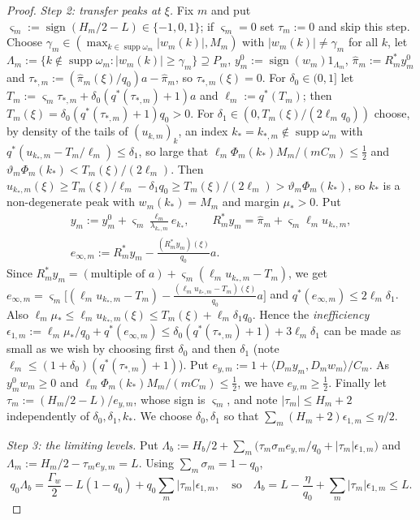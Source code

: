 \documentclass[10pt]{amsart}
\theoremstyle{definition}
\theoremstyle{remark}
\newcommand{\supp}{\operatorname{supp}}
\newcommand{\sgn}{\operatorname{sign}}
\newcommand{\ip}[2]{\langle #1,#2\rangle}
\begin{document}
\begin{proof}
\emph{Step 2: transfer peaks at $\xi$.}  Fix $m$ and put
$\varsigma_m:=\sgn(H_m/2-L)\in\{-1,0,1\}$; if $\varsigma_m=0$ set
$\tau_m:=0$ and skip this step.  Choose $\gamma_m\in(\max_{k\in\supp\omega_m}
|w_m(k)|,M_m)$ with $|w_m(k)|\ne\gamma_m$ for all $k$, let
$\Lambda_m:=\{k\notin\supp\omega_m:|w_m(k)|\ge\gamma_m\}\supseteq P_m$,
$y^0_m:=\sgn(w_m)1_{\Lambda_m}$, $\hat\pi_m:=R_m^*y^0_m$ and
$\tau_{*,m}:=(\hat\pi_m(\xi)/q_0)a-\hat\pi_m$, so $\tau_{*,m}(\xi)=0$.  For
$\delta_0\in(0,1]$ let $T_m:=\varsigma_m\tau_{*,m}+\delta_0(q^*(\tau_{*,m})+1)
a$ and $\ell_m:=q^*(T_m)$; then $T_m(\xi)=\delta_0(q^*(\tau_{*,m})+1)q_0>0$.
For $\delta_1\in(0,T_m(\xi)/(2\ell_mq_0))$ choose, by density of the tails
of $(u_{k,m})_k$, an index $k_*=k_{*,m}\notin\supp\omega_m$ with
$q^*(u_{k_*,m}-T_m/\ell_m)\le\delta_1$, so large that $\ell_m\Phi_m(k_*)
M_m/(mC_m)\le\frac12$ and $\vartheta_m\Phi_m(k_*)<T_m(\xi)/(2\ell_m)$.  Then
$u_{k_*,m}(\xi)\ge T_m(\xi)/\ell_m-\delta_1q_0\ge T_m(\xi)/(2\ell_m)>
\vartheta_m\Phi_m(k_*)$, so $k_*$ is a non-degenerate peak with
$w_m(k_*)=M_m$ and margin $\mu_*>0$.  Put
\begin{gather*}
 y_m:=y^0_m+\varsigma_m\frac{\ell_m}{\lambda_{k_*,m}}e_{k_*},\qquad
 R_m^*y_m=\hat\pi_m+\varsigma_m\ell_mu_{k_*,m},\\
 e_{\infty,m}:=R_m^*y_m-\frac{(R_m^*y_m)(\xi)}{q_0}a .
\end{gather*}
Since $R_m^*y_m=(\text{multiple of }a)+\varsigma_m(\ell_mu_{k_*,m}-T_m)$, we get
$e_{\infty,m}=\varsigma_m\big[(\ell_mu_{k_*,m}-T_m)-\frac{(\ell_mu_{k_*,m}-
T_m)(\xi)}{q_0}a\big]$ and $q^*(e_{\infty,m})\le2\ell_m\delta_1$.  Also
$\ell_m\mu_*\le\ell_mu_{k_*,m}(\xi)\le T_m(\xi)+\ell_m\delta_1q_0$.  Hence the
\emph{inefficiency} $\epsilon_{1,m}:=\ell_m\mu_*/q_0+q^*(e_{\infty,m})\le
\delta_0(q^*(\tau_{*,m})+1)+3\ell_m\delta_1$ can be made as small as we
wish by choosing first $\delta_0$ and then $\delta_1$ (note $\ell_m\le
(1+\delta_0)(q^*(\tau_{*,m})+1)$).  Put
$e_{y,m}:=1+\ip{D_my_m}{D_mw_m}/C_m$.  As $y^0_mw_m\ge0$ and
$\ell_m\Phi_m(k_*)M_m/(mC_m)\le\frac12$, we have $e_{y,m}\ge\frac12$.
Finally let $\tau_m:=(H_m/2-L)/e_{y,m}$, whose sign is $\varsigma_m$, and
note $|\tau_m|\le H_m+2$ independently of $\delta_0,\delta_1,k_*$.  We
choose $\delta_0,\delta_1$ so that $\sum_m(H_m+2)\epsilon_{1,m}\le\eta/2$.

\emph{Step 3: the limiting levels.}  Put
$\Lambda_b:=H_b/2+\sum_m\big(\tau_m\sigma_me_{y,m}/q_0+|\tau_m|
\epsilon_{1,m}\big)$ and $\Lambda_m:=H_m/2-\tau_me_{y,m}=L$.  Using
$\sum_m\sigma_m=1-q_0$,
\[
 q_0\Lambda_b=\frac{\Gamma_w}2-L(1-q_0)+q_0\sum_m|\tau_m|\epsilon_{1,m},
 \quad\text{so}\quad
 \Lambda_b=L-\frac\eta{q_0}+\sum_m|\tau_m|\epsilon_{1,m}\le L .
\]


\end{proof}
\end{document}
